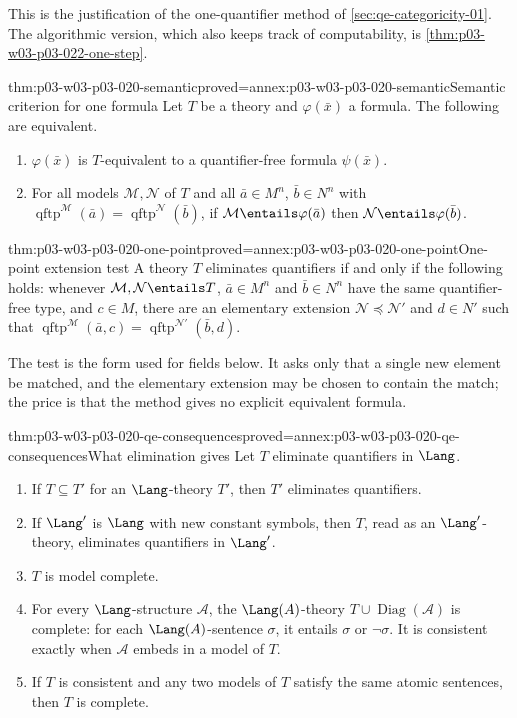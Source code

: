 This is the justification of the one-quantifier method of
\cref{sec:qe-categoricity-01}. The algorithmic version, which also keeps
track of computability, is \cref{thm:p03-w03-p03-022-one-step}.

\begin{hbtheorem}{thm:p03-w03-p03-020-semantic}{proved=annex:p03-w03-p03-020-semantic}{Semantic criterion for one formula}
Let \(T\) be a theory and \(\varphi(\bar x)\) a formula. The following are
equivalent.
\begin{enumerate}
\item \(\varphi(\bar x)\) is \(T\)-equivalent to a quantifier-free formula
  \(\psi(\bar x)\).
\item For all models \(\mathcal M,\mathcal N\) of \(T\) and all
  \(\bar a\in M^n\), \(\bar b\in N^n\) with
  \(\operatorname{qftp}^{\mathcal M}(\bar a)=\operatorname{qftp}^{\mathcal N}(\bar b)\),
  if \(\mathcal M\entails\varphi(\bar a)\) then
  \(\mathcal N\entails\varphi(\bar b)\).
\end{enumerate}
\end{hbtheorem}

\begin{hbtheorem}{thm:p03-w03-p03-020-one-point}{proved=annex:p03-w03-p03-020-one-point}{One-point extension test}
A theory \(T\) eliminates quantifiers if and only if the following holds:
whenever \(\mathcal M,\mathcal N\entails T\),
\(\bar a\in M^n\) and \(\bar b\in N^n\) have the same quantifier-free type,
and \(c\in M\), there are an elementary extension
\(\mathcal N\preccurlyeq\mathcal N'\) and \(d\in N'\) such that
\(\operatorname{qftp}^{\mathcal M}(\bar a,c)=\operatorname{qftp}^{\mathcal N'}(\bar b,d)\).
\end{hbtheorem}

The test is the form used for fields below. It asks only that a single new
element be matched, and the elementary extension may be chosen to contain the
match; the price is that the method gives no explicit equivalent formula.

\begin{hbcorollary}{thm:p03-w03-p03-020-qe-consequences}{proved=annex:p03-w03-p03-020-qe-consequences}{What elimination gives}
Let \(T\) eliminate quantifiers in \(\Lang\).
\begin{enumerate}
\item If \(T\subseteq T'\) for an \(\Lang\)-theory \(T'\), then \(T'\)
  eliminates quantifiers.
\item If \(\Lang'\) is \(\Lang\) with new constant symbols, then \(T\),
  read as an \(\Lang'\)-theory, eliminates quantifiers in \(\Lang'\).
\item \(T\) is model complete.
\item For every \(\Lang\)-structure \(\mathcal A\), the
  \(\Lang(A)\)-theory \(T\cup\operatorname{Diag}(\mathcal A)\) is complete:
  for each \(\Lang(A)\)-sentence \(\sigma\), it entails \(\sigma\) or
  \(\neg\sigma\). It is consistent exactly when \(\mathcal A\) embeds in a
  model of \(T\).
\item If \(T\) is consistent and any two models of \(T\) satisfy the same
  atomic sentences, then \(T\) is complete.
\end{enumerate}
\end{hbcorollary}

